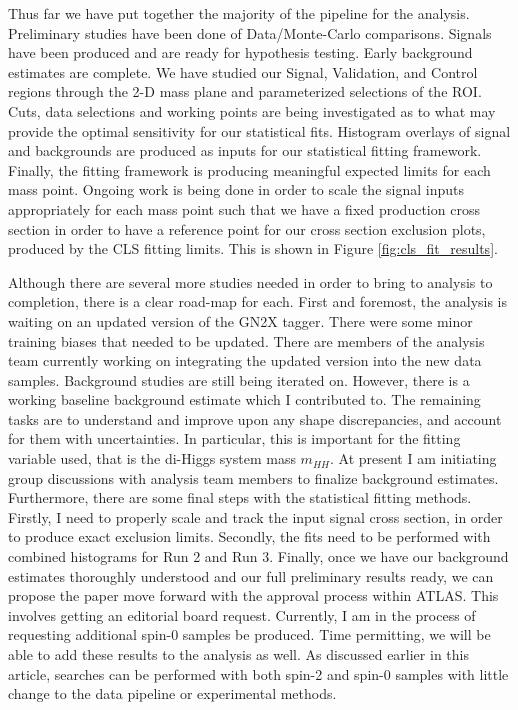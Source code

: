 \documentclass[12pt]{article}
\begin{document}
Thus far we have put together the majority of the pipeline for the analysis.
Preliminary studies have been done of Data/Monte-Carlo comparisons. Signals have
been produced and are ready for hypothesis testing. Early background estimates
are complete. We have studied our Signal, Validation, and Control regions
through the 2-D mass plane and parameterized selections of the ROI. Cuts, data
selections and working points are being investigated as to what may provide the
optimal sensitivity for our statistical fits. Histogram overlays of signal and
backgrounds are produced as inputs for our statistical fitting framework.
Finally, the fitting framework is producing meaningful expected limits for each
mass point. Ongoing work is being done in order to scale the signal inputs
appropriately for each mass point such that we have a fixed production cross
section in order to have a reference point for our cross section exclusion
plots, produced by the CLS fitting limits. This is shown in Figure
\ref{fig:cls_fit_results}. 

Although there are several more studies needed in order to bring to analysis to
completion, there is a clear road-map for each. First and foremost, the analysis
is waiting on an updated version of the GN2X tagger. There were some minor
training biases that needed to be updated. There are members of the analysis
team currently working on integrating the updated version into the new data
samples. Background studies are still being iterated on. However, there is a
working baseline background estimate which I contributed to. The remaining tasks
are to understand and improve upon any shape discrepancies, and account for them
with uncertainties. In particular, this is important for the fitting variable
used, that is the di-Higgs system mass $m_{HH}$. At present I am initiating
group discussions with analysis team members to finalize background estimates.
Furthermore, there are some final steps with the statistical fitting methods.
Firstly, I need to properly scale and track the input signal cross section, in
order to produce exact exclusion limits. Secondly, the fits need to be performed
with combined histograms for Run 2 and Run 3. Finally, once we have our
background estimates thoroughly understood and our full preliminary results
ready, we can propose the paper move forward with the approval process within
ATLAS. This involves getting an editorial board request. Currently, I am in the
process of requesting additional spin-0 samples be produced. Time permitting, we
will be able to add these results to the analysis as well. As discussed earlier
in this article, searches can be performed with both spin-2 and spin-0 samples
with little change to the data pipeline or experimental methods.
\end{document}
